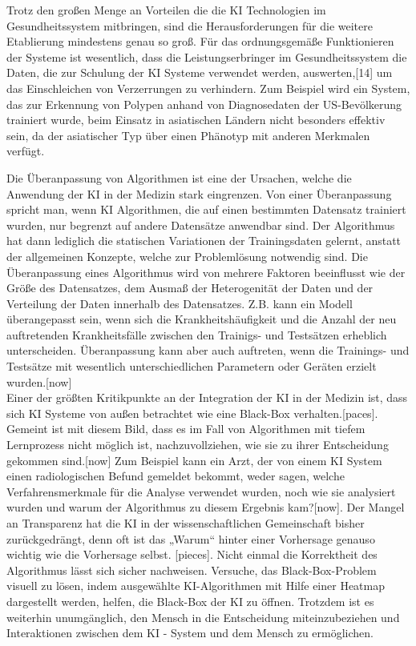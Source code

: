 Trotz den großen Menge an Vorteilen die die KI Technologien im Gesundheitssystem mitbringen, sind die Herausforderungen für die weitere Etablierung mindestens genau so groß. Für das ordnungsgemäße Funktionieren der Systeme ist wesentlich, dass die Leistungserbringer im Gesundheitssystem die Daten, die zur Schulung der KI Systeme verwendet werden, auswerten,[14] um das Einschleichen von Verzerrungen zu verhindern. Zum Beispiel wird ein System, das zur Erkennung von Polypen anhand von Diagnosedaten der US-Bevölkerung trainiert wurde, beim Einsatz in asiatischen Ländern nicht besonders effektiv sein, da der asiatischer Typ über einen Phänotyp mit anderen Merkmalen verfügt.

Die Überanpassung von Algorithmen ist eine der Ursachen, welche die Anwendung der KI in der Medizin stark eingrenzen. Von einer Überanpassung spricht man, wenn KI Algorithmen, die auf einen bestimmten Datensatz trainiert wurden, nur begrenzt auf andere Datensätze anwendbar sind. Der Algorithmus hat dann lediglich die statischen Variationen der Trainingsdaten gelernt, anstatt der allgemeinen Konzepte, welche zur Problemlösung notwendig sind. Die Überanpassung eines Algorithmus wird von mehrere Faktoren beeinflusst wie der Größe des Datensatzes, dem Ausmaß der Heterogenität der Daten und der Verteilung der Daten innerhalb des Datensatzes. Z.B. kann ein Modell überangepasst sein, wenn sich die Krankheitshäufigkeit und die Anzahl der neu auftretenden Krankheitsfälle zwischen den Trainigs- und Testsätzen erheblich unterscheiden. Überanpassung kann aber auch auftreten, wenn die Trainings- und Testsätze mit wesentlich unterschiedlichen Parametern oder Geräten erzielt wurden.[now]\\

Einer der größten Kritikpunkte an der Integration der KI in der Medizin ist, dass sich KI Systeme von außen betrachtet wie eine Black-Box verhalten.[paces]. Gemeint ist mit diesem Bild, dass es im Fall von Algorithmen mit tiefem Lernprozess nicht möglich ist, nachzuvollziehen, wie sie zu ihrer Entscheidung gekommen sind.[now] Zum Beispiel kann ein Arzt, der von einem KI System einen radiologischen Befund gemeldet bekommt, weder sagen, welche Verfahrensmerkmale für die Analyse verwendet wurden, noch wie sie analysiert wurden und warum der Algorithmus zu diesem Ergebnis kam?[now]. Der Mangel an Transparenz hat die KI in der wissenschaftlichen Gemeinschaft bisher zurückgedrängt, denn oft ist das „Warum“ hinter einer Vorhersage genauso wichtig wie die Vorhersage selbst. [pieces]. 
Nicht einmal die Korrektheit des Algorithmus lässt sich sicher nachweisen. Versuche, das Black-Box-Problem visuell zu lösen, indem ausgewählte KI-Algorithmen mit Hilfe einer Heatmap dargestellt werden, helfen, die Black-Box der KI zu öffnen. Trotzdem ist es weiterhin unumgänglich, den Mensch in die Entscheidung miteinzubeziehen und Interaktionen zwischen dem KI - System und dem Mensch zu ermöglichen.\\

